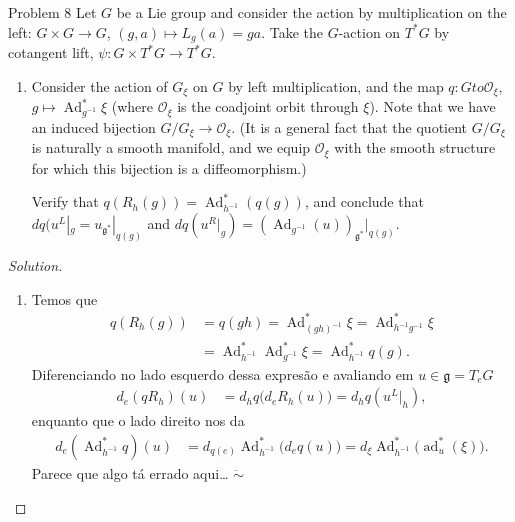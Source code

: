 \begin{thing3}{Problem 8}\leavevmode
	Let $G$ be a Lie group and consider the action by multiplication on the left: $G\times G \to G$, $(g,a)\mapsto L_g(a)=ga$. Take the $G$-action on $T^*G$ by cotangent lift, $\psi:G \times T^* G\to T^* G$.
\begin{enumerate}[label=(\alph*)]
\item Consider the action of $G_\xi$ on $G $ by left multiplication, and the map $q:G to \mathcal{O}_\xi$, $g \mapsto  \operatorname{Ad}_{g^{-1}}^*\xi$ (where $\mathcal{O}_\xi$ is the coadjoint orbit through $\xi$). Note that we have an induced bijection $G/G_\xi \to \mathcal{O}_\xi$. (It is a general fact that the quotient $G/G_\xi$ is naturally a smooth manifold, and we equip $\mathcal{O}_\xi$ with the smooth structure for which this bijection is a diffeomorphism.)

	Verify that $q(R_h(g))=\operatorname{Ad}^*_{h^{-1}}(q(g))$, and conclude that $dq(u^L|_{g}=u_{\mathfrak{g}^*}|_{q(g)}$ and $dq\left( u^R|_{g} \right) =\left( \operatorname{Ad}_{g^{-1}}(u) \right)_{\mathfrak{g}^*}|_{q(g)}$.

\end{enumerate}
\end{thing3}

\begin{proof}[Solution]\leavevmode
\begin{enumerate}[label=(\alph*)]
\item Temos que
	\begin{align*}
	q(R_h(g))&=q(gh)=\operatorname{Ad}^*_{(gh)^{-1}}\xi=\operatorname{Ad}^*_{h^{-1}g^{-1}}\xi\\&=\operatorname{Ad}^*_{h^{-1}}\operatorname{Ad}^*_{g^{-1}}\xi=\operatorname{Ad}^*_{h^{-1}}q(g).
	\end{align*}
Diferenciando no lado esquerdo dessa expresão e avaliando em $u \in \mathfrak{g}=T_eG$
\begin{align*}
d_e(qR_h)(u)&=d_{h}q\Big(d_eR_h(u)\Big)=d_hq(u^L|_{h}),
\end{align*}
enquanto que o lado direito nos da
\begin{align*}
d_e(\operatorname{Ad}_{h^{-1}}^*q)(u)&=d_{q(e)}\operatorname{Ad}^*_{h^{-1}}\Big(d_eq(u)\Big)=d_\xi\operatorname{Ad}^*_{h^{-1}}\Big(\operatorname{ad}^*_u(\xi)\Big).
\end{align*}
{\color{5}Parece que algo tá errado aqui… $ \ddot \sim$}

\end{enumerate}
\end{proof}


